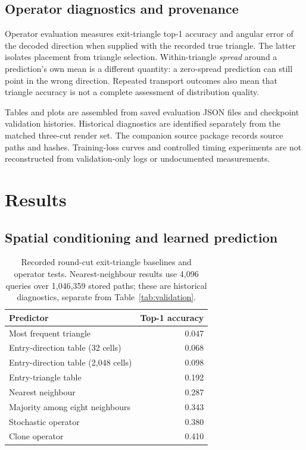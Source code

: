 \documentclass[conference]{IEEEtran}
\begin{document}
\subsection{Operator diagnostics and provenance}
Operator evaluation measures exit-triangle top-1 accuracy and angular error of
the decoded direction when supplied with the recorded true triangle. The latter
isolates placement from triangle selection. Within-triangle \emph{spread}
around a prediction's own mean is a different quantity: a zero-spread prediction
can still point in the wrong direction. Repeated transport outcomes also mean
that triangle accuracy is not a complete assessment of distribution quality.

Tables and plots are assembled from saved evaluation JSON files and checkpoint
validation histories. Historical diagnostics are identified separately from
the matched three-cut render set. The companion source package records source
paths and hashes. Training-loss curves and controlled timing experiments are
not reconstructed from validation-only logs or undocumented measurements.

\section{Results}
\label{sec:results}
\subsection{Spatial conditioning and learned prediction}
\begin{table}[t]
\caption{Recorded round-cut exit-triangle baselines and operator tests.
Nearest-neighbour results use 4,096 queries over 1,046,359 stored paths;
these are historical diagnostics, separate from Table~\ref{tab:validation}.}
\label{tab:baselines}
\centering\small
\begin{tabular}{@{}lr@{}}
\toprule
Predictor & Top-1 accuracy \\
\midrule
Most frequent triangle & 0.047 \\
Entry-direction table (32 cells) & 0.068 \\
Entry-direction table (2,048 cells) & 0.098 \\
Entry-triangle table & 0.192 \\
Nearest neighbour & 0.287 \\
Majority among eight neighbours & 0.343 \\
Stochastic operator & 0.380 \\
Clone operator & 0.410 \\
\bottomrule
\end{tabular}
\end{table}
\end{document}
